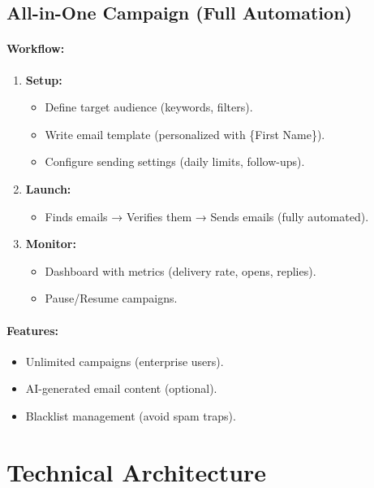 \documentclass{article}
\begin{document}
\subsection{All-in-One Campaign (Full Automation)}
\paragraph{Workflow:}
\begin{enumerate}
    \item \textbf{Setup:}
    \begin{itemize}
        \item Define target audience (keywords, filters).
        \item Write email template (personalized with \{First Name\}).
        \item Configure sending settings (daily limits, follow-ups).
    \end{itemize}
    \item \textbf{Launch:}
    \begin{itemize}
        \item Finds emails → Verifies them → Sends emails (fully automated).
    \end{itemize}
    \item \textbf{Monitor:}
    \begin{itemize}
        \item Dashboard with metrics (delivery rate, opens, replies).
        \item Pause/Resume campaigns.
    \end{itemize}
\end{enumerate}

\paragraph{Features:}
\begin{itemize}
    \item Unlimited campaigns (enterprise users).
    \item AI-generated email content (optional).
    \item Blacklist management (avoid spam traps).
\end{itemize}

\section{Technical Architecture}
\end{document}
